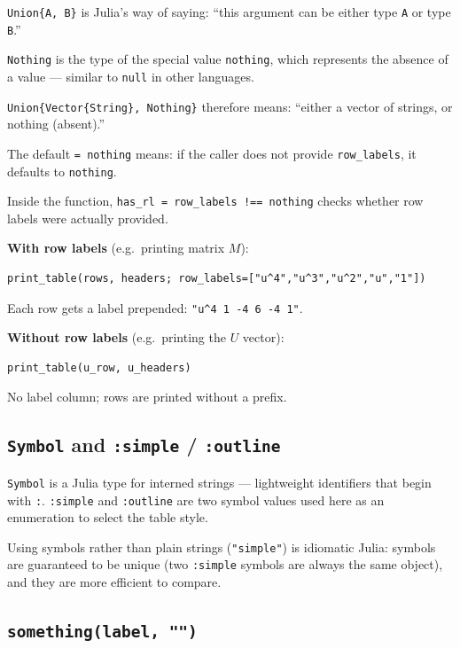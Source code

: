 \documentclass[12pt, a4paper]{article}
\newcommand{\cd}[1]{\texttt{#1}}
\begin{document}
\cd{Union\{A, B\}} is Julia's way of saying:
``this argument can be either type \cd{A} or type \cd{B}.''

\cd{Nothing} is the type of the special value \cd{nothing},
which represents the absence of a value ---
similar to \cd{null} in other languages.

\cd{Union\{Vector\{String\}, Nothing\}} therefore means:
``either a vector of strings, or nothing (absent).''

The default \cd{= nothing} means: if the caller does not
provide \cd{row\_labels}, it defaults to \cd{nothing}.

Inside the function, \cd{has\_rl = row\_labels !== nothing}
checks whether row labels were actually provided.

\begin{examplebox}
\textbf{With row labels} (e.g.\ printing matrix $M$):
\begin{verbatim}
print_table(rows, headers; row_labels=["u^4","u^3","u^2","u","1"])
\end{verbatim}
Each row gets a label prepended: \cd{"u\^{}4  1  -4  6  -4  1"}.

\textbf{Without row labels} (e.g.\ printing the $U$ vector):
\begin{verbatim}
print_table(u_row, u_headers)
\end{verbatim}
No label column; rows are printed without a prefix.
\end{examplebox}

\subsection{\texttt{Symbol} and \texttt{:simple} / \texttt{:outline}}

\cd{Symbol} is a Julia type for interned strings ---
lightweight identifiers that begin with \cd{:}.
\cd{:simple} and \cd{:outline} are two symbol values used here
as an enumeration to select the table style.

Using symbols rather than plain strings (\cd{"simple"}) is
idiomatic Julia: symbols are guaranteed to be unique
(two \cd{:simple} symbols are always the same object),
and they are more efficient to compare.

\subsection{\texttt{something(label, "")}}
\end{document}
